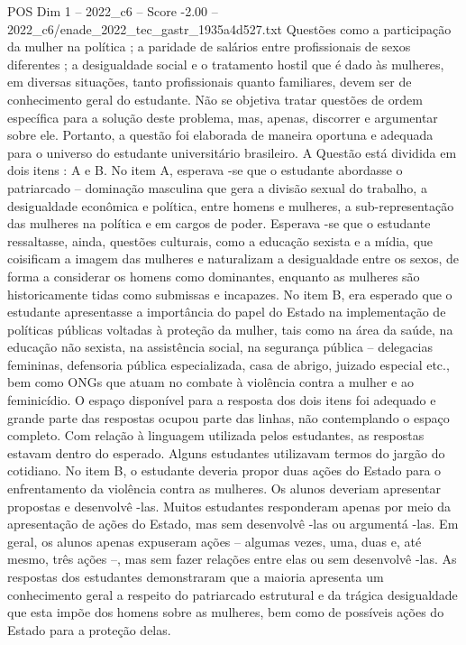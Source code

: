 \begin{textsample}{POS Dim 1 – 2022\_c6 – Score -2.00 – 2022\_c6/enade\_2022\_tec\_gastr\_1935a4d527.txt}
Questões como a participação da mulher na política ; a paridade de salários entre profissionais de sexos diferentes ; a desigualdade social e o tratamento hostil que é dado às mulheres, em diversas situações, tanto profissionais quanto familiares, devem ser de conhecimento geral do estudante.
Não se objetiva tratar questões de ordem específica para a solução deste problema, mas, apenas, discorrer e argumentar sobre ele.
Portanto, a questão foi elaborada de maneira oportuna e adequada para o universo do estudante universitário brasileiro.
A Questão está dividida em dois itens : A e B.
No item A, esperava -se que o estudante abordasse o patriarcado – dominação masculina que gera a divisão sexual do trabalho, a desigualdade econômica e política, entre homens e mulheres, a sub-representação das mulheres na política e em cargos de poder.
Esperava -se que o estudante ressaltasse, ainda, questões culturais, como a educação sexista e a mídia, que coisificam a imagem das mulheres e naturalizam a desigualdade entre os sexos, de forma a considerar os homens como dominantes, enquanto as mulheres são historicamente tidas como submissas e incapazes.
No item B, era esperado que o estudante apresentasse a importância do papel do Estado na implementação de políticas públicas voltadas à proteção da mulher, tais como na área da saúde, na educação não sexista, na assistência social, na segurança pública – delegacias femininas, defensoria pública especializada, casa de abrigo, juizado especial etc., bem como ONGs que atuam no combate à violência contra a mulher e ao feminicídio.
O espaço disponível para a resposta dos dois itens foi adequado e grande parte das respostas ocupou parte das linhas, não contemplando o espaço completo.
Com relação à linguagem utilizada pelos estudantes, as respostas estavam dentro do esperado.
Alguns estudantes utilizavam termos do jargão do cotidiano.
No item B, o estudante deveria propor duas ações do Estado para o enfrentamento da violência contra as mulheres.
Os alunos deveriam apresentar propostas e desenvolvê -las.
Muitos estudantes responderam apenas por meio da apresentação de ações do Estado, mas sem desenvolvê -las ou argumentá -las.
Em geral, os alunos apenas expuseram ações – algumas vezes, uma, duas e, até mesmo, três ações –, mas sem fazer relações entre elas ou sem desenvolvê -las.
As respostas dos estudantes demonstraram que a maioria apresenta um conhecimento geral a respeito do patriarcado estrutural e da trágica desigualdade que esta impõe dos homens sobre as mulheres, bem como de possíveis ações do Estado para a proteção delas.

\end{textsample}
